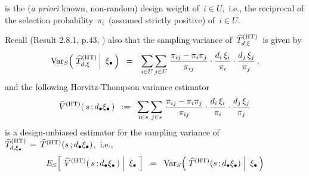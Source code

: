 \begin{itemize}
\begin{itemize}
        is the (\textit{a priori} known, non-random) design weight of \,$i \in U$,\,
        i.e., the reciprocal of the selection probability \,$\pi_{i}$\,
        (assumed strictly positive) of \,$i \in U$.\,
    \end{itemize}
    Recall (Result 2.8.1, p.43, \cite{Sarndal1992}) also that
    the sampling variance of 
    \,$
    \widehat{T}^{\textnormal{(HT)}}_{d,\xi}
    $\,
    is given by
    \begin{equation*}
    \textnormal{Var}_{S}\!\left(\,
        \left.
        \widehat{T}^{\textnormal{(HT)}}_{d,\xi}
        \,\right\vert\!
        \begin{array}{c} \xi_{\bullet} \end{array}
        \!\!\right)
    \;\; = \;\;\,
        \underset{i \in U}{\sum}\,
        \underset{j \in U}{\sum}\;
        \dfrac{\pi_{ij} - \pi_{i}\pi_{j}}{\pi_{ij}}
        \cdot
        \dfrac{d_{i}\,\xi_{i}}{\pi_{i}}
        \cdot
        \dfrac{d_{j}\,\xi_{j}}{\pi_{j}}\,,
    \end{equation*}
    and the following Horvitz-Thompson variance estimator
    \begin{equation*}
    \widehat{V}^{\textnormal{(HT)}}(\,s\,;d_{\bullet}\xi_{\bullet}\,)
    \;\; := \;\;
        \underset{i \in s}{\sum}\,
        \underset{j \in s}{\sum}\;
        \dfrac{\pi_{ij} - \pi_{i}\pi_{j}}{\pi_{ij}}
        \cdot
        \dfrac{d_{i}\,\xi_{i}}{\pi_{i}}
        \cdot
        \dfrac{d_{j}\,\xi_{j}}{\pi_{j}}
    \end{equation*}
    is a design-unbiased estimator for the sampling variance of
    \,$
    \widehat{T}^{\textnormal{(HT)}}_{d,\xi_{\bullet}}
    \,=\,
        \widehat{T}^{\textnormal{(HT)}}(s\,;d_{\bullet}\xi_{\bullet})
    $,\,
    i.e.,
    \begin{equation*}
    E_{S}\!\left[\;
        \left.
        \widehat{V}^{\textnormal{(HT)}}(\,s\,;\dbullet\xi_{\bullet}\,)
        \;\right\vert\!
        \begin{array}{c} \xi_{\bullet} \end{array}
        \!\right]
    \;\; = \;\;
        \Var_{S}\!\left(\,
            \left.
            \widehat{T}^{\textnormal{(HT)}}(s\,;\dbullet\xi_{\bullet})
            \;\right\vert\!
            \begin{array}{c} \xi_{\bullet} \end{array}
            \!\!\right)

\end{equation*}
\end{itemize}

